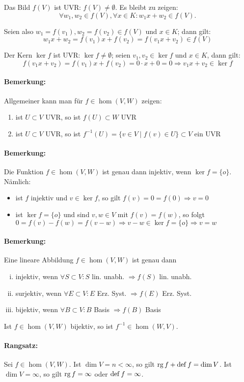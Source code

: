 	Das Bild $f(V)$ ist UVR: $f(V) \neq \emptyset$. Es bleibt zu zeigen:
		\begin{equation*}
			\forall w_1,w_2\in f(V), \forall x\in K: w_1x+w_2 \in f(V).
		\end{equation*}
	
	Seien also $w_1 = f(v_1), w_2 = f(v_2) \in f(V)$ und $x\in K$; dann gilt:
		\begin{equation*}
			w_1x+w_2 = f(v_1)x+f(v_2) = f(v_1x+v_2)\in f(V)
		\end{equation*}
		
	Der Kern $\ker f$ ist UVR: $\ker f\neq \emptyset$; seien $v_1,v_2\in \ker f$ und $x\in K$, dann gilt:
		\begin{equation*}
			f(v_1x+v_2) = f(v_1)x+f(v_2) = 0\cdot x + 0 = 0 \Rightarrow v_1x+v_2\in \ker f
		\end{equation*}

\paragraph{Bemerkung: }
	Allgemeiner kann man für $f\in \hom (V,W)$ zeigen:
		\begin{enumerate}
			\item ist $U\subset V$ UVR, so ist $f(U)\subset W$ UVR
			\item ist $U\subset V$ UVR, so ist $f^{-1}(U) = \{v\in V\mid f(v) \in U \}\subset V$ ein UVR
		\end{enumerate}

\paragraph{Bemerkung: }
	Die Funktion $f\in \hom (V,W)$ ist genau dann injektiv, wenn $\ker f = \{o\}$. Nämlich:
		\begin{itemize}
			\item ist $f$ injektiv und $v\in \ker f$, so gilt $f(v) = 0 = f(0) \Rightarrow v=0$
			\item ist $\ker f = \{ o \}$ und sind $v,w \in V$ mit $f(v) = f(w)$, so folgt\\
				$0=f(v)-f(w) = f(v-w) \Rightarrow v-w\in \ker f = \{o\} \Rightarrow v = w$
		\end{itemize}

\paragraph{Bemerkung: }
	Eine lineare Abbildung $ f\in \hom (V,W) $ ist genau dann
		\begin{enumerate}[(i)]
			\item injektiv, wenn $ \forall S\subset V: S$ lin. unabh. $ \Rightarrow f(S) $ lin. unabh.
			\item surjektiv, wenn $ \forall E \subset V:E $ Erz. Syst. $ \Rightarrow f(E)$ Erz. Syst.
			\item bijektiv, wenn $ \forall B\subset V: B$ Basis $ \Rightarrow f(B)$ Basis
		\end{enumerate}

	Ist $ f\in \hom (V,W) $ bijektiv, so ist $ f^{-1}\in \hom (W,V) $.

\paragraph{Rangsatz: }
	Sei $ f\in \hom (V,W) $. Ist $ \dim V = n < \infty $,  so gilt $\operatorname{rg} f + \operatorname{def} f = \dim V$.  Ist $ \dim V = \infty $, so gilt $ \operatorname{rg} f = \infty $ oder $ \operatorname{def} f = \infty $.

